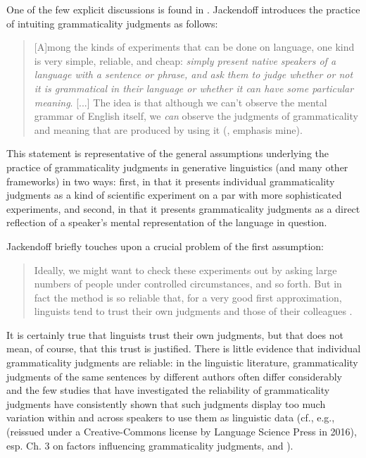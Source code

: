 One of the few explicit discussions is found in \citet{jackendoff_patterns_1994}. Jackendoff introduces the practice of intuiting  grammaticality  judgments as follows:

\begin{quote}
[A]mong the kinds of experiments  that can be done on language, one kind is very simple, reliable, and cheap: \emph{simply present native speakers of a language with a sentence or phrase, and ask them to judge whether or not it is grammatical in their language or whether it can have some particular meaning}. [...] The idea is that although we can't observe the mental grammar of English itself, we \emph{can} observe the judgments of grammaticality  and meaning that are produced by using it (\citealt[47]{jackendoff_patterns_1994}, emphasis mine).
\end{quote}

This statement is representative of the general assumptions underlying the practice of grammaticality  judgments in generative  linguistics (and many other frameworks) in two ways: first, in that it presents individual grammaticality judgments as a kind of scientific experiment  on a par with more sophisticated experiments, and second, in that it presents grammaticality judgments as a direct reflection of a speaker's mental representation of the language in question.

Jackendoff briefly touches upon a crucial problem of the first assumption:

\begin{quote}
Ideally, we might want to check these experiments  out by asking large numbers of people under controlled circumstances, and so forth. But in fact the method is so reliable that, for a very good first approximation, linguists tend to trust their own judgments and those of their colleagues \citep[48]{jackendoff_patterns_1994}.
\end{quote}

It is certainly true that linguists trust their own judgments, but that does not mean, of course, that this trust is justified. There is little evidence that individual grammaticality  judgments are reliable:  in the linguistic literature, grammaticality judgments of the same sentences by different authors often differ considerably and the few studies that have investigated the reliability of grammaticality judgments have consistently shown that such judgments display too much variation  within and across speakers to use them as linguistic data (cf., e.g., \citet{schutze_empirical_1996} (reissued under a Creative\hyp{}Commons license by Language Science Press in 2016), esp. Ch. 3 on factors influencing grammaticality  judgments, and \citet{cowart_experimental_1997}).

